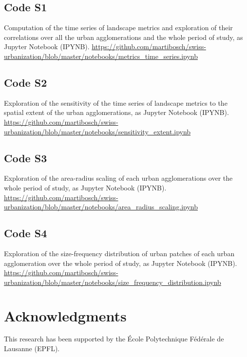 \documentclass[10pt,letterpaper]{article}
\begin{document}
\setcounter{figure}{0}
\renewcommand{\thefigure}{S\arabic{figure}}


\subsection*{Code S1}
\label{code-metrics-time-series}
Computation of the time series of landscape metrics and exploration of their correlations over all the urban agglomerations and the whole period of study, as Jupyter Notebook (IPYNB).
\url{https://github.com/martibosch/swiss-urbanization/blob/master/notebooks/metrics_time_series.ipynb}

\subsection*{Code S2}
\label{code-sensitivity-extent}
Exploration of the sensitivity of the time series of landscape metrics to the spatial extent of the urban agglomerations, as Jupyter Notebook (IPYNB).
\url{https://github.com/martibosch/swiss-urbanization/blob/master/notebooks/sensitivity_extent.ipynb}

\subsection*{Code S3}
\label{code-area-radius-scaling}
Exploration of the area-radius scaling of each urban agglomerations over the whole period of study, as Jupyter Notebook (IPYNB).
\url{https://github.com/martibosch/swiss-urbanization/blob/master/notebooks/area_radius_scaling.ipynb}

\subsection*{Code S4}
\label{code-size-frequency-distribution}
Exploration of the size-frequency distribution of urban patches of each urban agglomeration over the whole period of study, as Jupyter Notebook (IPYNB).
\url{https://github.com/martibosch/swiss-urbanization/blob/master/notebooks/size_frequency_distribution.ipynb}


\section*{Acknowledgments}
This research has been supported by the \'Ecole Polytechnique F\'ed\'erale de Lausanne (EPFL).

\nolinenumbers




\end{document}
